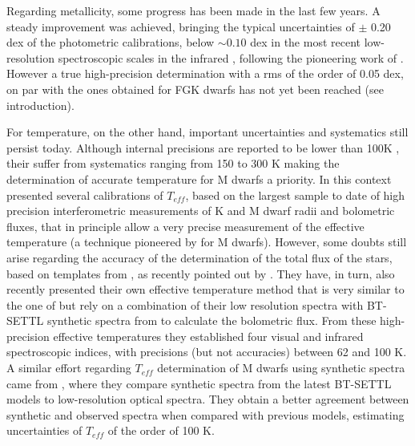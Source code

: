 \documentclass{aa}
\begin{document}
Regarding metallicity, some progress has been made in the last few years. A steady improvement was achieved, bringing the typical uncertainties of $\pm$ 0.20 dex of the photometric calibrations, below $\sim 0.10$ dex in the most recent low-resolution spectroscopic scales in the infrared \cite[e.g.][]{Rojas-Ayala-2012,Mann-2013a,Newton-2013}, following the pioneering work of \citet{Rojas-Ayala-2010}. However a true high-precision determination with a rms of the order of 0.05 dex, on par with the ones obtained for FGK dwarfs \citep[e.g.][]{Santos-2004b,Sousa-2007} has not yet been reached (see \citet{Neves-2012} introduction).

For temperature, on the other hand, important uncertainties and systematics still persist today. Although internal precisions are reported to be lower than 100K \citep[e.g.][]{Casagrande-2008,Rojas-Ayala-2012,Boyajian-2012}, their suffer from systematics ranging from 150 to 300 K making the determination of accurate temperature for M dwarfs a priority. In this context \citet{Boyajian-2012} presented several calibrations of $T_{eff}$, based on the largest sample to date of high precision interferometric measurements of K and M dwarf radii and bolometric fluxes, that in principle allow a very precise measurement of the effective temperature (a technique pioneered by \citet{Segransan-2003} for M dwarfs). However, some doubts still arise regarding the accuracy of the determination of the total flux of the stars, based on templates from \citet{Pickles-1998}, as recently pointed out by \citet[][]{Mann-2013b}. They have, in turn, also recently presented their own effective temperature method that is very similar to the one of \citet{Boyajian-2012} but rely on a combination of their low resolution spectra with BT-SETTL synthetic spectra from \citet{Allard-2011,Allard-2013} to calculate the bolometric flux. From these high-precision effective temperatures they established four visual and infrared spectroscopic indices, with precisions (but not accuracies) between 62 and 100 K. A similar effort regarding $T_{eff}$ determination of M dwarfs using synthetic spectra came from \citet{Rajpurohit-2013a}, where they compare synthetic spectra from the latest BT-SETTL models \citep{Allard-2012} to low-resolution optical spectra. They obtain a better agreement between synthetic and observed spectra when compared with previous models, estimating uncertainties of $T_{eff}$ of the order of 100 K. 

\end{document}
